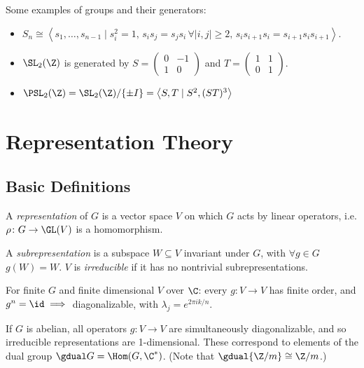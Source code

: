 \documentclass{notes}
\begin{document}
\begin{example}
    Some examples of groups and their generators:
    \begin{itemize}
        \item $S_n\cong \left\langle {s}_{1},\ldots,{s}_{n-1} \mid  s_i^2 =1,\,s_is_j=s_js_i\,\forall |i,j|\ge 2,\, s_is_{i+1}s_i=s_{i+1}s_is_{i+1} \right\rangle$.
        \item $\SL_2(\Z )$ is generated by $S=\begin{pmatrix}0&-1\\1&0 \end{pmatrix} $ and $T=\begin{pmatrix} 1&1\\0&1 \end{pmatrix} $.
        \item $\PSL_2(\Z )=\SL_2(\Z )/\{\pm I\}=\left\langle S,T\mid  S^2,(ST)^3  \right\rangle$
    \end{itemize}
\end{example}

\section{Representation Theory}

\subsection{Basic Definitions}

\begin{defn}
    A \emph{representation} of $G$ is a vector space $V$ on which $G$ acts by linear operators, i.e. $\rho \colon G \to \GL (V)$ is a homomorphism.

    A \emph{subrepresentation} is a subspace $W\subseteq V$ invariant under $G$, with $\forall g\in G$ $g(W)=W$. $V$ is \emph{irreducible} if it has no nontrivial subrepresentations. 
\end{defn}

\begin{theorem}
    For finite $G$ and finite dimensional $V$ over $\C $: every $g\colon V \to V $ has finite order, and $g^{n}=\id \implies $ diagonalizable, with $\lambda _j=e^{2\pi i k/n}$.
\end{theorem}

\begin{theorem}
    If $G$ is abelian, all operators $g\colon V \to V$ are simultaneously diagonalizable, and so irreducible representations are 1-dimensional. These correspond to elements of the dual group $\gdual G=\Hom (G,\C^{*})$. (Note that $\gdual {\Z/m}\cong \Z /m$.) 
\end{theorem}
\end{document}
